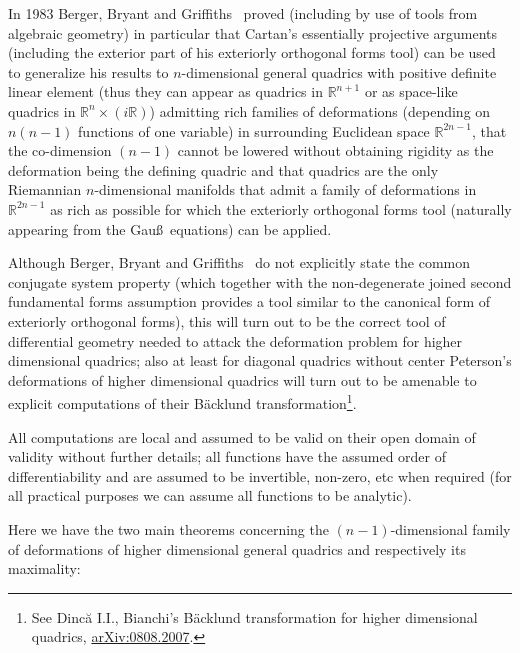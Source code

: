 \documentclass[11pt]{article}
\begin{document}
In 1983 Berger, Bryant and Grif\/f\/iths~\cite{B} proved (including by
use of tools from algebraic geometry) in particular that Cartan's
essentially projective arguments (including the exterior part of
his exteriorly orthogonal forms tool) can be used to generalize
his results to $n$-dimensional general quadrics with positive
def\/inite linear element (thus they can appear as quadrics in
$\mathbb{R}^{n+1}$ or as space-like quadrics in
$\mathbb{R}^n\times(i\mathbb{R})$) admitting rich families of
deformations (depending on $n(n-1)$ functions of one variable) in
surrounding Euclidean space $\mathbb{R}^{2n-1}$, that the
co-dimension $(n-1)$ cannot be lowered without obtaining rigidity
as the deformation being the def\/ining quadric and that quadrics
are the only Riemannian $n$-dimensional manifolds that admit a
family of deformations in $\mathbb{R}^{2n-1}$ as rich as possible
for which the exteriorly orthogonal forms tool (naturally
appearing from the Gau\ss\ equations) can be applied.

Although Berger, Bryant and Grif\/f\/iths~\cite{B} do not explicitly
state the common conjugate system property (which together with
the non-degenerate joined second fundamental forms assumption
provides a tool similar to the canonical form of exteriorly
orthogonal forms), this will turn out to be the correct tool of
dif\/ferential geometry needed to attack the deformation problem for
higher dimensional quadrics; also at least for diagonal quadrics
without center Peterson's deformations of higher dimensional
quadrics will turn out to be amenable to explicit computations of
their B\"{a}cklund transformation\footnote{See Dinc\u{a} I.I., Bianchi's
B\"{a}cklund transformation for higher dimensional quadrics,
\href{http://arxiv.org/abs/0808.2007}{arXiv:0808.2007}.}.

All computations are local and assumed to be valid on their open
domain of validity without further details; all functions have the
assumed order of dif\/ferentiability and are assumed to be
invertible, non-zero, etc when required (for all practical
purposes we can assume all functions to be analytic).

Here we have the two main theorems concerning the
$(n-1)$-dimensional family of deformations of higher dimensional
general quadrics and respectively its maximality:
\end{document}
